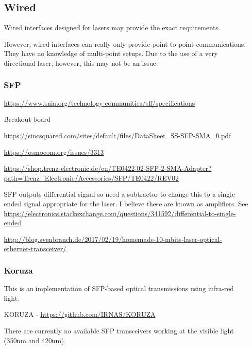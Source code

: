 \documentclass{article}
\begin{document}
\subsection{Wired}
Wired interfaces designed for lasers may provide the exact requirements.

However, wired interfaces can really only provide point to point communications. They have no knowledge of multi-point setups. Due to the use of a very directional laser, however, this may not be an issue.

\subsubsection{\ac{SFP}}

\url{https://www.snia.org/technology-communities/sff/specifications}

Breakout board

\url{https://sincsquared.com/sites/default/files/DataSheet_SS-SFP-SMA_0.pdf}

\url{https://osmocom.org/issues/3313}

\url{https://shop.trenz-electronic.de/en/TE0422-02-SFP-2-SMA-Adapter?path=Trenz_Electronic/Accessories/SFP/TE0422/REV02}

\ac{SFP} outputs differential signal so need a subtractor to change this to a single ended signal appropriate for the laser. I believe these are known as amplifiers. See \url{https://electronics.stackexchange.com/questions/341592/differential-to-single-ended}

\url{http://blog.svenbrauch.de/2017/02/19/homemade-10-mbits-laser-optical-ethernet-transceiver/}

\subsubsection{Koruza}
This is an implementation of \ac{SFP}-based optical transmissions using infra-red light.

KORUZA - \url{https://github.com/IRNAS/KORUZA}

There are currently no available \ac{SFP} transceivers working at the visible light (350nm and 420nm).



\end{document}
